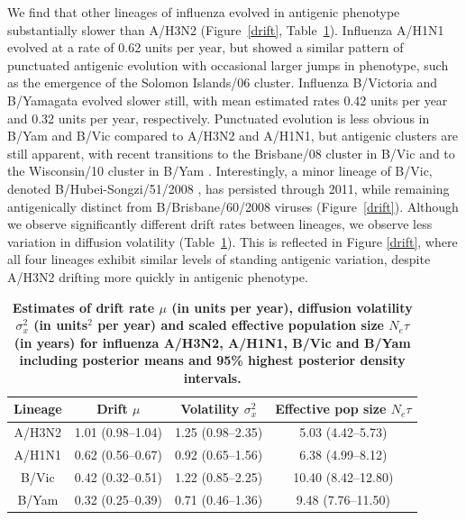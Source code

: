 \documentclass[11pt,oneside,letterpaper]{article}
\newcommand{\virussd}{\sigma_x}						%
\newcommand{\drift}{\mu}							%
\begin{document}
We find that other lineages of influenza evolved in antigenic phenotype substantially slower than A/H3N2 (Figure~\ref{drift}, Table~\ref{paramtable}).
Influenza A/H1N1 evolved at a rate of 0.62 units per year, but showed a similar pattern of punctuated antigenic evolution with occasional larger jumps in phenotype, such as the emergence of the Solomon Islands/06 cluster.  
Influenza B/Victoria and B/Yamagata evolved slower still, with mean estimated rates 0.42 units per year and 0.32 units per year, respectively.
Punctuated evolution is less obvious in B/Yam and B/Vic compared to A/H3N2 and A/H1N1, but antigenic clusters are still apparent, with recent transitions to the Brisbane/08 cluster in B/Vic \cite{Barr10} and to the Wisconsin/10 cluster in B/Yam \cite{Klimov12}.
Interestingly, a minor lineage of B/Vic, denoted B/Hubei-Songzi/51/2008 \cite{Barr10}, has persisted through 2011, while remaining antigenically distinct from B/Brisbane/60/2008 viruses (Figure~\ref{drift}).
Although we observe significantly different drift rates between lineages, we observe less variation in diffusion volatility (Table~\ref{paramtable}).
This is reflected in Figure \ref{drift}, where all four lineages exhibit similar levels of standing antigenic variation, despite A/H3N2 drifting more quickly in antigenic phenotype.

\begin{table}[h]
	\centering
	\caption{\textbf{Estimates of drift rate $\drift$ (in units per year), diffusion volatility $\virussd^2$ (in units$^2$ per year) and scaled effective population size $N_e\tau$ (in years) for influenza A/H3N2, A/H1N1, B/Vic and B/Yam including posterior means and 95\% highest posterior density intervals.}}
	\label{paramtable}	
	\begin{tabular}{ c c c c} 
	\hline
	Lineage	&	Drift $\drift$  	& 	Volatility $\virussd^2$	&	Effective pop size $N_e\tau$	\\
	\hline		
	A/H3N2	&	1.01 (0.98--1.04)	&	1.25 (0.98--2.35) 		&	5.03 (4.42--5.73)	\\
	A/H1N1	&	0.62 (0.56--0.67)	&	0.92 (0.65--1.56) 		&	6.38 (4.99--8.12)	\\
	B/Vic	&	0.42 (0.32--0.51)	&	1.22 (0.85--2.25) 		&	10.40 (8.42--12.80)	\\
	B/Yam	&	0.32 (0.25--0.39)	&	0.71 (0.46--1.36) 		&	9.48 (7.76--11.50)	\\
	\hline
	\end{tabular}	
\end{table}
\end{document}
